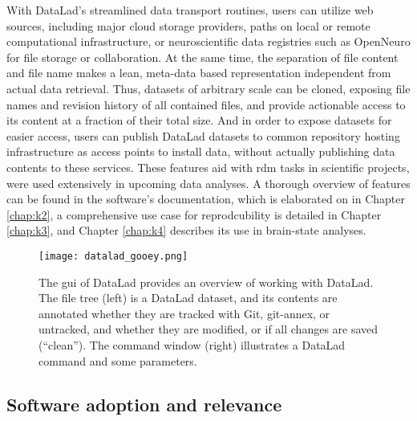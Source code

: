{With DataLad's streamlined data transport routines, users can utilize web sources, including major cloud storage providers, paths on local or remote computational infrastructure, or neuroscientific data registries such as OpenNeuro \citep{markiewicz2021openneuro} for file storage or collaboration.
At the same time, the separation of file content and file name makes a lean, meta-data based representation independent from actual data retrieval.
Thus, datasets of arbitrary scale can be cloned, exposing file names and revision history of all contained files, and provide actionable access to its content at a fraction of their total size.
And in order to expose datasets for easier access, users can publish DataLad datasets to common repository hosting infrastructure as access points to install data, without actually publishing data contents to these services.
These features aid with \gls{rdm} tasks in scientific projects, were used extensively in upcoming data analyses.
A thorough overview of features can be found in the software's documentation, which is elaborated on in Chapter \ref{chap:k2},  a comprehensive use case for reprodcubility is detailed in Chapter \ref{chap:k3}, and Chapter \ref{chap:k4} describes its use in brain-state analyses.

\begin{figure}
	\centering
	\texttt{[image: datalad\_gooey.png]}
	\caption[DataLad: Graphical User Interface]{The \gls{gui} of DataLad provides an overview of working with DataLad. The file tree (left) is a DataLad dataset, and its contents are annotated whether they are tracked with Git, git-annex, or untracked, and whether they are modified, or if all changes are saved (``clean''). The command window (right) illustrates a DataLad command and some parameters.}
	\label{fig:gooey}
\end{figure}

\subsection{Software adoption and relevance}

}
